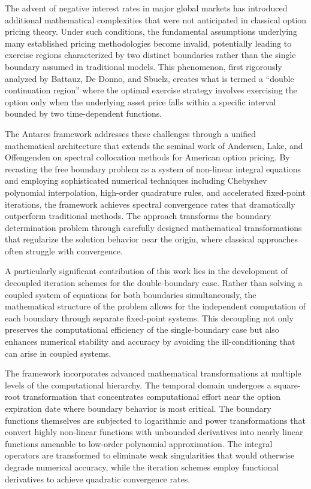 \documentclass[
  american,
  11pt,
  11pt,
  letterpaper,
  onecolumn]{article}
\begin{document}
The advent of negative interest rates in major global markets has
introduced additional mathematical complexities that were not
anticipated in classical option pricing theory. Under such conditions,
the fundamental assumptions underlying many established pricing
methodologies become invalid, potentially leading to exercise regions
characterized by two distinct boundaries rather than the single boundary
assumed in traditional models. This phenomenon, first rigorously
analyzed by Battauz, De Donno, and Sbuelz, creates what is termed a
``double continuation region'' where the optimal exercise strategy
involves exercising the option only when the underlying asset price
falls within a specific interval bounded by two time-dependent
functions.

The Antares framework addresses these challenges through a unified
mathematical architecture that extends the seminal work of Andersen,
Lake, and Offengenden on spectral collocation methods for American
option pricing. By recasting the free boundary problem as a system of
non-linear integral equations and employing sophisticated numerical
techniques including Chebyshev polynomial interpolation, high-order
quadrature rules, and accelerated fixed-point iterations, the framework
achieves spectral convergence rates that dramatically outperform
traditional methods. The approach transforms the boundary determination
problem through carefully designed mathematical transformations that
regularize the solution behavior near the origin, where classical
approaches often struggle with convergence.

A particularly significant contribution of this work lies in the
development of decoupled iteration schemes for the double-boundary case.
Rather than solving a coupled system of equations for both boundaries
simultaneously, the mathematical structure of the problem allows for the
independent computation of each boundary through separate fixed-point
systems. This decoupling not only preserves the computational efficiency
of the single-boundary case but also enhances numerical stability and
accuracy by avoiding the ill-conditioning that can arise in coupled
systems.

The framework incorporates advanced mathematical transformations at
multiple levels of the computational hierarchy. The temporal domain
undergoes a square-root transformation that concentrates computational
effort near the option expiration date where boundary behavior is most
critical. The boundary functions themselves are subjected to logarithmic
and power transformations that convert highly non-linear functions with
unbounded derivatives into nearly linear functions amenable to low-order
polynomial approximation. The integral operators are transformed to
eliminate weak singularities that would otherwise degrade numerical
accuracy, while the iteration schemes employ functional derivatives to
achieve quadratic convergence rates.
\end{document}
